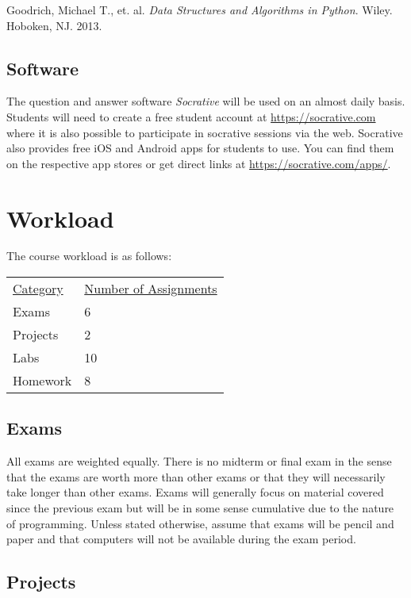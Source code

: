 \documentclass[10pt]{article}
\begin{document}
\noindent
Goodrich, Michael T., et. al. \textit{Data Structures and Algorithms in Python}. Wiley. Hoboken, NJ. 2013. %


\subsection{Software}

The question and answer software \textit{Socrative} will be used on an almost daily basis. Students will need to create a free student account at \url{https://socrative.com} where it is also possible to participate in socrative sessions via the web.  Socrative also provides free iOS and Android apps for students to use. You can find them on the respective app stores or get direct links at \url{https://socrative.com/apps/}.

\section{Workload}

The course workload is as follows:
\begin{center}
  \begin{tabular}{ll}
    \underline{Category} & \underline{Number of Assignments} \\
    Exams & 6 \\
    Projects & 2 \\
    Labs & 10 \\
    Homework & 8
  \end{tabular}
\end{center}

\subsection*{Exams}

All exams are weighted equally. There is no midterm or final exam in the sense that the exams are worth more than other exams or that they will necessarily take longer than other exams.  Exams will generally focus on material covered since the previous exam but will be in some sense cumulative due to the nature of programming. Unless stated otherwise, assume that exams will be pencil and paper and that computers will not be available during the exam period.

\subsection*{Projects}
\end{document}
